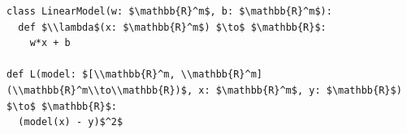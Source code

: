 \documentclass[border=10pt]{standalone}
\begin{document}
\begin{lstlisting}
class LinearModel(w: $\mathbb{R}^m$, b: $\mathbb{R}^m$):
  def $\\lambda$(x: $\mathbb{R}^m$) $\to$ $\mathbb{R}$:
    w*x + b
 
def L(model: $[\\mathbb{R}^m, \\mathbb{R}^m](\\mathbb{R}^m\\to\\mathbb{R})$, x: $\mathbb{R}^m$, y: $\mathbb{R}$) $\to$ $\mathbb{R}$:
  (model(x) - y)$^2$
\end{lstlisting}
\end{document}
